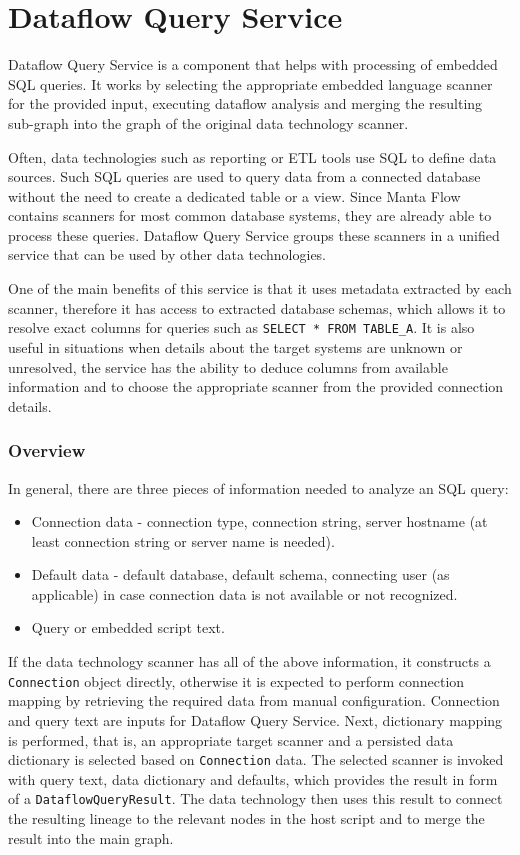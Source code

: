 \section{Dataflow Query Service}

Dataflow Query Service is a component that helps with processing of embedded SQL queries. It works by selecting the appropriate embedded language scanner for the provided input, executing dataflow analysis and merging the resulting sub-graph into the graph of the original data technology scanner.
\par
Often, data technologies such as reporting or ETL tools use SQL to define data sources. Such SQL queries are used to query data from a connected database without the need to create a dedicated table or a view. Since Manta Flow contains scanners for most common database systems, they are already able to process these queries. Dataflow Query Service groups these scanners in a unified service that can be used by other data technologies.
\par
One of the main benefits of this service is that it uses metadata extracted by each scanner, therefore it has access to extracted database schemas, which allows it to resolve exact columns for queries such as \texttt{SELECT * FROM TABLE\_A}. It is also useful in situations when details about the target systems are unknown or unresolved, the service has the ability to deduce columns from available information and to choose the appropriate scanner from the provided connection details.

\subsubsection{Overview}
In general, there are three pieces of information needed to analyze an SQL query:
\begin{itemize}
    \item Connection data - connection type, connection string, server hostname (at least connection string or server name is needed).
    \item Default data - default database, default schema, connecting user (as applicable) in case connection data is not available or not recognized.
    \item Query or embedded script text.
\end{itemize}
If the data technology scanner has all of the above information, it constructs a \texttt{Connection} object directly, otherwise it is expected to perform connection mapping by retrieving the required data from manual configuration. Connection and query text are inputs for Dataflow Query Service. Next, dictionary mapping is performed, that is, an appropriate target scanner and a persisted data dictionary is selected based on \texttt{Connection} data. The selected scanner is invoked with query text, data dictionary and defaults, which provides the result in form of a \texttt{DataflowQueryResult}. The data technology then uses this result to connect the resulting lineage to the relevant nodes in the host script and to merge the result into the main graph.

